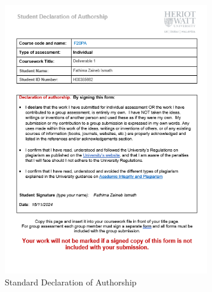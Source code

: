 \begin{figure}[htbp]
    \centering
    \includegraphics[width=0.8\textwidth]{appendices/images/declaration.PNG}
    \caption{Standard Declaration of Authorship}
    \label{fig:declaration_form}
\end{figure}
